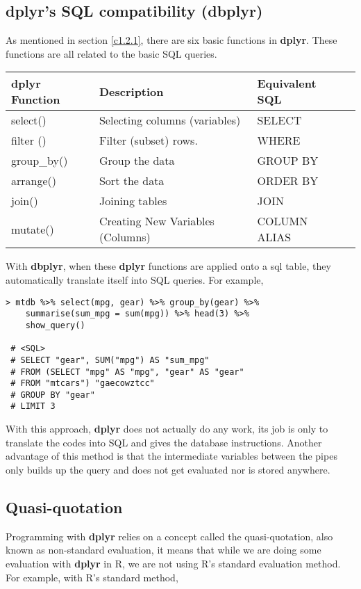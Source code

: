 \subsection{dplyr's SQL compatibility (dbplyr)}
As mentioned in section \ref{c1.2.1}, there are six basic functions in {\bf dplyr}. These functions are all related to the basic {\sf SQL} queries.

\begin{center}
\begin{tabular}{ |l|l|l|l| } 
\hline
\textbf{dplyr Function} & \textbf{Description} & \textbf{Equivalent SQL} \\
\hline
select() & Selecting columns (variables) & SELECT \\ 
filter () & Filter (subset) rows. & WHERE \\ 
group\_by() & Group the data & GROUP BY \\ 
arrange() & Sort the data & ORDER BY \\ 
join() & Joining tables & JOIN \\ 
mutate() & Creating New Variables (Columns) & COLUMN ALIAS \\ 
\hline
\end{tabular}
\end{center}

With {\bf dbplyr}, when these {\bf dplyr} functions are applied onto a sql table, they automatically translate itself into {\sf SQL} queries. For example,

\begin{lstlisting}
> mtdb %>% select(mpg, gear) %>% group_by(gear) %>% 
    summarise(sum_mpg = sum(mpg)) %>% head(3) %>% 
    show_query()
 
 # <SQL>
 # SELECT "gear", SUM("mpg") AS "sum_mpg"
 # FROM (SELECT "mpg" AS "mpg", "gear" AS "gear"
 # FROM "mtcars") "gaecowztcc"
 # GROUP BY "gear"
 # LIMIT 3
\end{lstlisting}
With this approach, {\bf dplyr} does not actually do any work, its job is only to translate the codes into {\sf SQL} and gives the database instructions. Another advantage of this method is that the intermediate variables between the pipes only builds up the query and does not get evaluated nor is stored anywhere. 

\subsection{Quasi-quotation}
Programming with {\bf dplyr} relies on a concept called the quasi-quotation, also known as non-standard evaluation, it means that while we are doing some evaluation with {\bf dplyr} in {\sf R}, we are not using {\sf R}'s standard evaluation method. For example, with {\sf R}'s standard method, 

